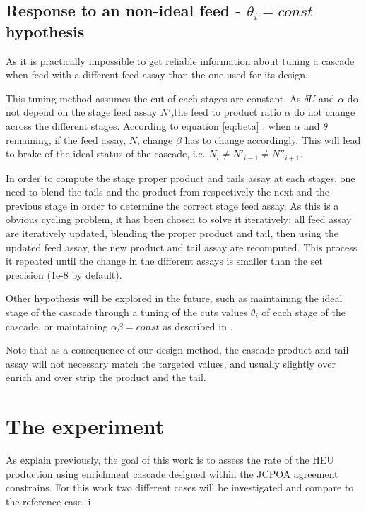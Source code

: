 \documentclass{anstrans}
\begin{document}
\subsection{Response to an non-ideal feed - $\theta_{i} = const$ hypothesis}

As it is practically impossible to get reliable information about tuning a
cascade when feed with a different feed assay than the one used for its design.

This tuning method assumes the cut of each stages are constant. As $\delta
U$ and $\alpha$ do not depend on the stage feed assay $N'$,the feed to product
ratio $\alpha$ do not change across the different stages. According to equation
\eqref{eq:beta} , when $\alpha$ and $\theta$ remaining, if the feed assay,
$N$, change $\beta$ has to change accordingly.  This will lead to brake of the
ideal status of the cascade, i.e.  $N_{i} \neq N'_{i-1} \neq N''_{i+1}$.

In order to compute the stage proper product and tails assay at each stages, one
need to blend the tails and the product from respectively the next and the
previous stage in order to determine the correct stage feed assay. As this is a
obvious cycling problem, it has been chosen to solve it iteratively: all feed
assay are iteratively updated, blending the proper product and tail, then using
the updated feed assay, the new product and tail assay are recomputed. This
process it repeated until the change in the different assays is smaller than the
set precision (1e-8 by default).

Other hypothesis will be explored in the future, such as maintaining the ideal
stage of the cascade through a tuning of the cuts values $\theta_{i}$ of each
stage of the cascade, or maintaining $\alpha\beta = const$ as described in
\cite{walker2017}.

Note that as a consequence of our design method, the cascade product and tail
assay will not necessary match the targeted values, and usually slightly over
enrich and over strip the product and the tail.

\section{The experiment}

As explain previously, the goal of this work is to assess the rate of the HEU
production using enrichment cascade designed within the JCPOA agreement
constrains. For this work two different cases will be investigated and compare
to the reference case.
i
\end{document}
